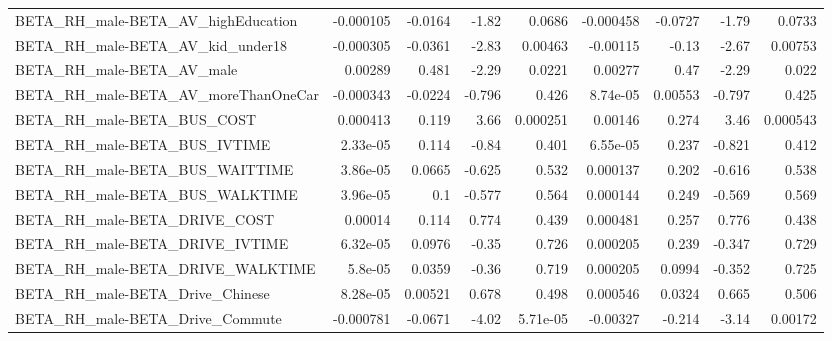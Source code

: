 \begin{tabular}{lrrrrrrrr}
BETA\_RH\_male-BETA\_AV\_highEducation                 &   -0.000105 &      -0.0164 &    -1.82 &   0.0686 &  -0.000458 &     -0.0727 &        -1.79 &        0.0733 \\
BETA\_RH\_male-BETA\_AV\_kid\_under18                   &   -0.000305 &      -0.0361 &    -2.83 &  0.00463 &   -0.00115 &       -0.13 &        -2.67 &       0.00753 \\
BETA\_RH\_male-BETA\_AV\_male                          &     0.00289 &        0.481 &    -2.29 &   0.0221 &    0.00277 &        0.47 &        -2.29 &         0.022 \\
BETA\_RH\_male-BETA\_AV\_moreThanOneCar                &   -0.000343 &      -0.0224 &   -0.796 &    0.426 &   8.74e-05 &     0.00553 &       -0.797 &         0.425 \\
BETA\_RH\_male-BETA\_BUS\_COST                         &    0.000413 &        0.119 &     3.66 & 0.000251 &    0.00146 &       0.274 &         3.46 &      0.000543 \\
BETA\_RH\_male-BETA\_BUS\_IVTIME                       &    2.33e-05 &        0.114 &    -0.84 &    0.401 &   6.55e-05 &       0.237 &       -0.821 &         0.412 \\
BETA\_RH\_male-BETA\_BUS\_WAITTIME                     &    3.86e-05 &       0.0665 &   -0.625 &    0.532 &   0.000137 &       0.202 &       -0.616 &         0.538 \\
BETA\_RH\_male-BETA\_BUS\_WALKTIME                     &    3.96e-05 &          0.1 &   -0.577 &    0.564 &   0.000144 &       0.249 &       -0.569 &         0.569 \\
BETA\_RH\_male-BETA\_DRIVE\_COST                       &     0.00014 &        0.114 &    0.774 &    0.439 &   0.000481 &       0.257 &        0.776 &         0.438 \\
BETA\_RH\_male-BETA\_DRIVE\_IVTIME                     &    6.32e-05 &       0.0976 &    -0.35 &    0.726 &   0.000205 &       0.239 &       -0.347 &         0.729 \\
BETA\_RH\_male-BETA\_DRIVE\_WALKTIME                   &     5.8e-05 &       0.0359 &    -0.36 &    0.719 &   0.000205 &      0.0994 &       -0.352 &         0.725 \\
BETA\_RH\_male-BETA\_Drive\_Chinese                    &    8.28e-05 &      0.00521 &    0.678 &    0.498 &   0.000546 &      0.0324 &        0.665 &         0.506 \\
BETA\_RH\_male-BETA\_Drive\_Commute                    &   -0.000781 &      -0.0671 &    -4.02 & 5.71e-05 &   -0.00327 &      -0.214 &        -3.14 &       0.00172 \\

\end{tabular}
